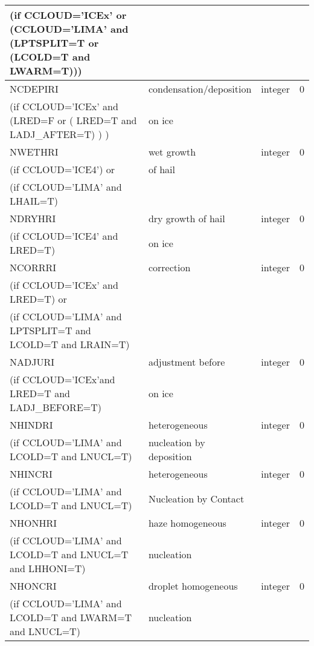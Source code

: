 \begin{longtable} {|p{}|p{}|>{\centering}p{}|p{}<{\centering}|}
(if CCLOUD='ICEx' or (CCLOUD='LIMA' and (LPTSPLIT=T or (LCOLD=T and LWARM=T))) & &   &  \\\hline
NCDEPIRI&   condensation/deposition & integer  &  0 \index{NCDEPIRI!\innam{NAM\_BU\_RRI}}\\ \nopagebreak
(if CCLOUD='ICEx' and (LRED=F or ( LRED=T and LADJ\_AFTER=T) )  ) &  on ice&   &  \\\hline
NWETHRI &   wet growth  & integer  &  0 \index{NWETHRI!\innam{NAM\_BU\_RRI}}\\ \nopagebreak
(if CCLOUD='ICE4') or &of hail &   &  \\ \nopagebreak
(if CCLOUD='LIMA' and LHAIL=T) & &   &  \\\hline
NDRYHRI&    dry growth of hail& integer  &  0 \index{NDRYHRI!\innam{NAM\_BU\_RRI}}\\ \nopagebreak
(if CCLOUD='ICE4' and LRED=T) &  on ice&   &  \\\hline
NCORRRI&   correction & integer  &  0 \index{NCORRRI!\innam{NAM\_BU\_RRI}}\\ \nopagebreak
(if CCLOUD='ICEx' and LRED=T) or & &   &  \\ \nopagebreak
(if CCLOUD='LIMA' and LPTSPLIT=T and LCOLD=T and LRAIN=T) & &   &  \\\hline
NADJURI&   adjustment before & integer  &  0 \index{NADJURI!\innam{NAM\_BU\_RRI}}\\ \nopagebreak
(if CCLOUD='ICEx'and LRED=T and LADJ\_BEFORE=T) &  on ice&   &  \\\hline
NHINDRI &  heterogeneous     & integer  &  0 \index{NHINDRI!\innam{NAM\_BU\_RRI}}\\ \nopagebreak
(if CCLOUD='LIMA' and LCOLD=T and LNUCL=T) &nucleation by deposition &   &  \\\hline
NHINCRI & heterogeneous     & integer  &  0 \index{NHINCRI!\innam{NAM\_BU\_RRI}}\\ \nopagebreak
(if CCLOUD='LIMA' and LCOLD=T and LNUCL=T)   & Nucleation by Contact  &       &   \\\hline
NHONHRI & haze homogeneous     & integer  &  0 \index{NHONHRI!\innam{NAM\_BU\_RRI}}\\ \nopagebreak
(if CCLOUD='LIMA' and LCOLD=T and LNUCL=T and LHHONI=T) & nucleation  &   &  \\\hline
NHONCRI & droplet homogeneous     & integer  &  0 \index{NHONCRI!\innam{NAM\_BU\_RRI}}\\ \nopagebreak
(if CCLOUD='LIMA' and LCOLD=T and LWARM=T and LNUCL=T)   &nucleation   &       &   \\\hline

\end{longtable}
